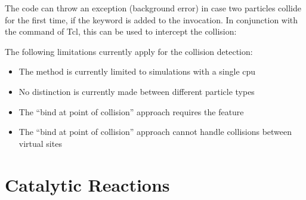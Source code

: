 The code can throw an exception (background error) in case two
particles collide for the first time, if the  keyword
is added to the invocation. In conjunction with the 
command of Tcl, this can be used to intercept the collision:

The following limitations currently apply for the collision detection:
\begin{itemize}
\item The method is currently limited to simulations with a single cpu
\item No distinction is currently made between different particle types
\item The ``bind at point of collision'' approach requires the
   feature
\item The ``bind at point of collision'' approach cannot handle
  collisions between virtual sites
\end{itemize}

\section{Catalytic Reactions}
\label{sec:Reactions}

